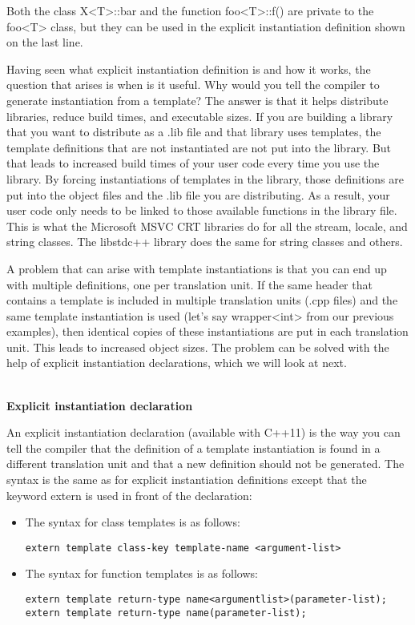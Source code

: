Both the class X<T>::bar and the function foo<T>::f() are private to the foo<T> class, but they can be used in the explicit instantiation definition shown on the last line.

Having seen what explicit instantiation definition is and how it works, the question that arises is when is it useful. Why would you tell the compiler to generate instantiation from a template? The answer is that it helps distribute libraries, reduce build times, and executable sizes. If you are building a library that you want to distribute as a .lib file and that library uses templates, the template definitions that are not instantiated are not put into the library. But that leads to increased build times of your user code every time you use the library. By forcing instantiations of templates in the library, those definitions are put into the object files and the .lib file you are distributing. As a result, your user code only needs to be linked to those available functions in the library file. This is what the Microsoft MSVC CRT libraries do for all the stream, locale, and string classes. The libstdc++ library does the same for string classes and others.

A problem that can arise with template instantiations is that you can end up with multiple definitions, one per translation unit. If the same header that contains a template is included in multiple translation units (.cpp files) and the same template instantiation is used (let's say wrapper<int> from our previous examples), then identical copies of these instantiations are put in each translation unit. This leads to increased object sizes. The problem can be solved with the help of explicit instantiation declarations, which we will look at next.

\hspace*{\fill} \\ %
\noindent\textbf{Explicit instantiation declaration}

An explicit instantiation declaration (available with C++11) is the way you can tell the compiler that the definition of a template instantiation is found in a different translation unit and that a new definition should not be generated. The syntax is the same as for explicit instantiation definitions except that the keyword extern is used in front of the declaration:

\begin{itemize}
\item 
The syntax for class templates is as follows:
\begin{lstlisting}[style=styleCXX]
extern template class-key template-name <argument-list>
\end{lstlisting}

\item 
The syntax for function templates is as follows:
\begin{lstlisting}[style=styleCXX]
extern template return-type name<argumentlist>(parameter-list);
extern template return-type name(parameter-list);
\end{lstlisting}
\end{itemize}

